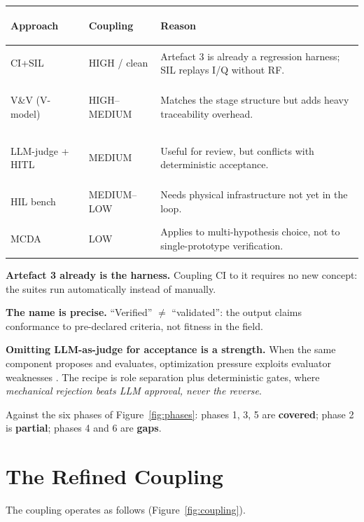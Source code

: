 \documentclass[11pt,a4paper]{article}
\begin{document}
\begin{table}[htbp]
\centering
\caption{Coupling of each validation methodology with zz\_Workflow.}
\label{tab:coupling}
\small
{}
\begin{longtable}{@{}>{\bfseries\raggedright}p{30mm}>{\raggedright}p{28mm}>{\raggedright\arraybackslash}p{75mm}@{}}
\rowcolor{headbg}\textbf{Approach} & \textbf{Coupling} & \textbf{Reason}\\
\endhead
CI+SIL & HIGH / clean & Artefact 3 is already a regression harness; SIL replays I/Q without RF.\\
V\&V (V-model) & HIGH--MEDIUM & Matches the stage structure but adds heavy traceability overhead.\\
LLM-judge + HITL & MEDIUM & Useful for review, but conflicts with deterministic acceptance.\\
HIL bench & MEDIUM--LOW & Needs physical infrastructure not yet in the loop.\\
MCDA & LOW & Applies to multi-hypothesis choice, not to single-prototype verification.\\
\end{longtable}
\end{table}

\textbf{Artefact 3 already is the harness.} Coupling CI to it requires no new concept: the
suites run automatically instead of manually.

\textbf{The name is precise.} ``Verified'' $\ne$ ``validated'': the output claims
conformance to pre-declared criteria, not fitness in the field.

\textbf{Omitting LLM-as-judge for acceptance is a strength.} When the same component
proposes and evaluates, optimization pressure exploits evaluator weaknesses
\cite{judge2026}. The recipe is role separation plus deterministic gates, where
\emph{mechanical rejection beats LLM approval, never the reverse}.

Against the six phases of Figure~\ref{fig:phases}: phases 1, 3, 5 are \textbf{covered};
phase 2 is \textbf{partial}; phases 4 and 6 are \textbf{gaps}.

\section{The Refined Coupling}

The coupling operates as follows (Figure~\ref{fig:coupling}).
\end{document}
